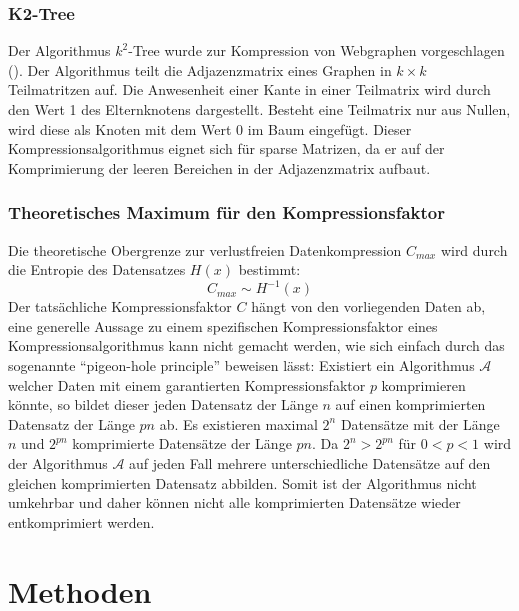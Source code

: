 \documentclass{ffhsthesis}
\begin{document}
\subsection{K2-Tree}
Der Algorithmus $k^{2}$-Tree wurde zur Kompression von Webgraphen vorgeschlagen (\cite{brisaboa2014compact}). Der Algorithmus teilt die Adjazenzmatrix eines Graphen in $k \times k$ Teilmatritzen auf. Die Anwesenheit einer Kante in einer Teilmatrix wird durch den Wert 1 des Elternknotens dargestellt. Besteht eine Teilmatrix nur aus Nullen, wird diese als Knoten mit dem Wert 0 im Baum eingefügt. Dieser Kompressionsalgorithmus eignet sich für sparse Matrizen, da er auf der Komprimierung der leeren Bereichen in der Adjazenzmatrix aufbaut.
\subsection{Theoretisches Maximum für den Kompressionsfaktor} %
\label{ch:entropy}
Die theoretische Obergrenze zur verlustfreien Datenkompression $C_{max}$ wird durch die Entropie des Datensatzes $H(x)$ bestimmt:
\begin{equation}
\label{eq:entropy}
    C_{max} \sim H^{-1}(x)
\end{equation}
Der tatsächliche Kompressionsfaktor $C$ hängt von den vorliegenden Daten ab, eine generelle Aussage zu einem spezifischen Kompressionsfaktor eines Kompressionsalgorithmus kann nicht gemacht werden, wie sich einfach durch das sogenannte ``pigeon-hole principle'' beweisen lässt: Existiert ein Algorithmus $\mathcal{A}$ welcher Daten mit einem garantierten Kompressionsfaktor $p$ komprimieren könnte, so bildet dieser jeden Datensatz der Länge $n$ auf einen komprimierten Datensatz der Länge $pn$ ab. Es existieren maximal $2^n$ Datensätze mit der Länge $n$ und $2^{pn}$ komprimierte Datensätze der Länge $pn$. Da $2^n > 2^{pn}$ für $0<p<1$ wird der Algorithmus $\mathcal{A}$ auf jeden Fall mehrere unterschiedliche Datensätze auf den gleichen komprimierten Datensatz abbilden.  Somit ist der Algorithmus nicht umkehrbar und daher können nicht alle komprimierten Datensätze wieder entkomprimiert werden.

\chapter{Methoden} %
\end{document}
